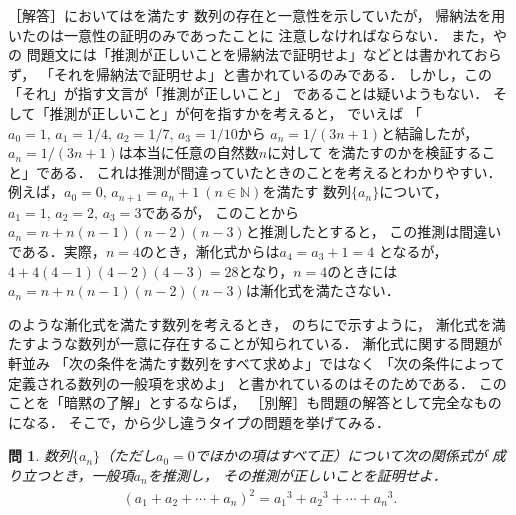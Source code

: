 \documentclass[11pt,a4paper]{ltjsarticle} %
\theoremstyle{mystyle} %
\newtheorem{que}{問} %
\begin{document}
［解答］においてはを満たす
数列の存在と一意性を示していたが，
帰納法を用いたのは一意性の証明のみであったことに
注意しなければならない．
また，やの
問題文には「推測が正しいことを帰納法で証明せよ」などとは書かれておらず，
「それを帰納法で証明せよ」と書かれているのみである．
しかし，この「それ」が指す文言が「推測が正しいこと」
であることは疑いようもない．
そして「推測が正しいこと」が何を指すかを考えると，
でいえば
「$a_0 = 1, \, a_1 = 1/4, \, a_2 = 1/7, \, a_3 = 1/10$から
$a_n = 1/(3n+1)$と結論したが，$a_n = 1/(3n+1)$は本当に任意の自然数$n$に対して
を満たすのかを検証すること」である．
これは推測が間違っていたときのことを考えるとわかりやすい．
例えば，$a_0 = 0, \, a_{n+1} = a_n + 1 \ (n \in \mathbb{N})$を満たす
数列$\{ a_n \}$について，$a_1=1, \, a_2 = 2, \, a_3 = 3 $であるが，
このことから$a_n = n + n(n-1)(n-2)(n-3)$と推測したとすると，
この推測は間違いである．実際，$n=4$のとき，漸化式からは$a_4 = a_3 + 1 = 4$
となるが，$4 + 4(4-1)(4-2)(4-3) = 28$となり，$n=4$のときには
$a_n = n + n(n-1)(n-2)(n-3)$は漸化式を満たさない．


のような漸化式を満たす数列を考えるとき，
のちにで示すように，
漸化式を満たすような数列が一意に存在することが知られている．
漸化式に関する問題が軒並み
「次の条件を満たす数列をすべて求めよ」ではなく
「次の条件によって定義される数列の一般項を求めよ」
と書かれているのはそのためである．
このことを「暗黙の了解」とするならば，
［別解］も問題の解答として完全なものになる．
そこで，\cite{chert}から少し違うタイプの問題を挙げてみる．

\begin{que} \label{que:suisokuchert2}
  数列$\{ a_n \}$（ただし$a_0 = 0$でほかの項はすべて正）について次の関係式が
  成り立つとき，一般項$a_n$を推測し，
  その推測が正しいことを証明せよ．
  \begin{align}
    ( a_1 + a_2 + \cdots + a_n )^2 =
    {a_1} ^3 + {a_2} ^3 + \cdots + {a_n } ^3 .
    \label{eq:suisoku2}
  \end{align}
\end{que}
\end{document}
